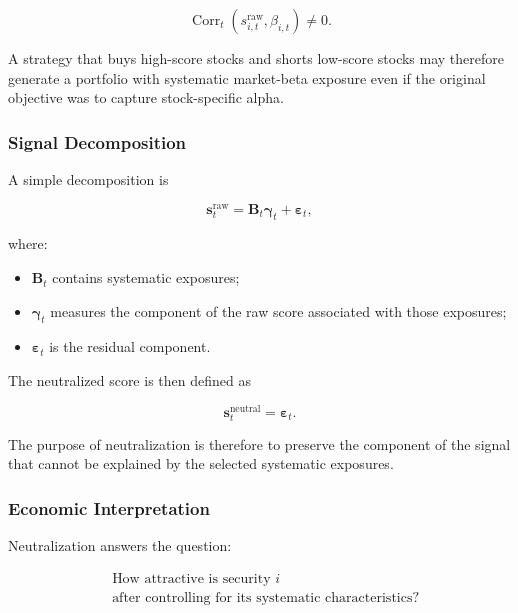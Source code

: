 \documentclass[11pt,a4paper]{article}
\begin{document}
\begin{equation}
\operatorname{Corr}_t
\left(
s_{i,t}^{\mathrm{raw}},
\beta_{i,t}
\right)
\neq
0.
\end{equation}

A strategy that buys high-score stocks and shorts low-score stocks may therefore
generate a portfolio with systematic market-beta exposure even if the original
objective was to capture stock-specific alpha.


\subsubsection{Signal Decomposition}

A simple decomposition is

\begin{equation}
\boxed{
\mathbf{s}_t^{\mathrm{raw}}
=
\mathbf{B}_t
\boldsymbol{\gamma}_t
+
\boldsymbol{\varepsilon}_t,
}
\end{equation}

where:

\begin{itemize}
    \item $\mathbf{B}_t$ contains systematic exposures;
    \item $\boldsymbol{\gamma}_t$ measures the component of the raw score
    associated with those exposures;
    \item $\boldsymbol{\varepsilon}_t$ is the residual component.
\end{itemize}

The neutralized score is then defined as

\begin{equation}
\boxed{
\mathbf{s}_t^{\mathrm{neutral}}
=
\boldsymbol{\varepsilon}_t.
}
\end{equation}

The purpose of neutralization is therefore to preserve the component of the
signal that cannot be explained by the selected systematic exposures.


\subsubsection{Economic Interpretation}

Neutralization answers the question:

\begin{equation}
\boxed{
\begin{aligned}
&\text{How attractive is security }i
\\
&\text{after controlling for its systematic characteristics?}
\end{aligned}
}
\end{equation}
\end{document}
